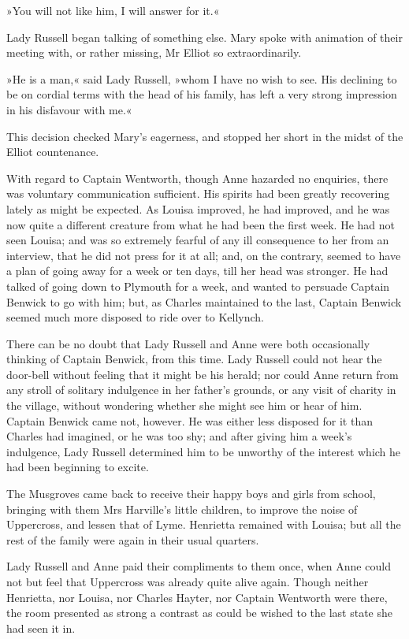 »You will not like him, I will answer for it.«

Lady Russell began talking of something else. Mary spoke with animation of their meeting with, or rather missing, Mr Elliot so extraordinarily.

»He is a man,« said Lady Russell, »whom I have no wish to see. His declining to be on cordial terms with the head of his family, has left a very strong impression in his disfavour with me.«

This decision checked Mary's eagerness, and stopped her short in the midst of the Elliot countenance.

With regard to Captain Wentworth, though Anne hazarded no enquiries, there was voluntary communication sufficient. His spirits had been greatly recovering lately as might be expected. As Louisa improved, he had improved, and he was now quite a different creature from what he had been the first week. He had not seen Louisa; and was so extremely fearful of any ill consequence to her from an interview, that he did not press for it at all; and, on the contrary, seemed to have a plan of going away for a week or ten days, till her head was stronger. He had talked of going down to Plymouth for a week, and wanted to persuade Captain Benwick to go with him; but, as Charles maintained to the last, Captain Benwick seemed much more disposed to ride over to Kellynch.

There can be no doubt that Lady Russell and Anne were both occasionally thinking of Captain Benwick, from this time. Lady Russell could not hear the door-bell without feeling that it might be his herald; nor could Anne return from any stroll of solitary indulgence in her father's grounds, or any visit of charity in the village, without wondering whether she might see him or hear of him. Captain Benwick came not, however. He was either less disposed for it than Charles had imagined, or he was too shy; and after giving him a week's indulgence, Lady Russell determined him to be unworthy of the interest which he had been beginning to excite.

The Musgroves came back to receive their happy boys and girls from school, bringing with them Mrs Harville's little children, to improve the noise of Uppercross, and lessen that of Lyme. Henrietta remained with Louisa; but all the rest of the family were again in their usual quarters.

Lady Russell and Anne paid their compliments to them once, when Anne could not but feel that Uppercross was already quite alive again. Though neither Henrietta, nor Louisa, nor Charles Hayter, nor Captain Wentworth were there, the room presented as strong a contrast as could be wished to the last state she had seen it in.

